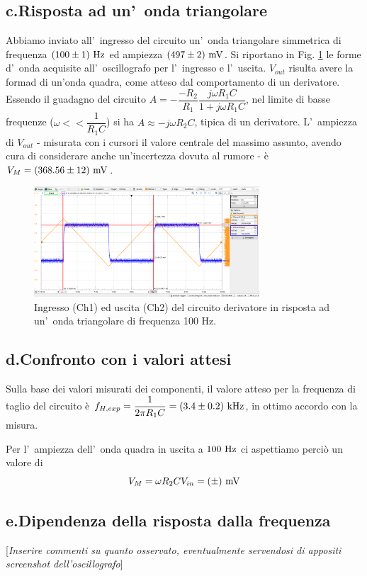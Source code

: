 \documentclass[10pt,a4paper]{article}
\newcommand{\rem}[1]{[\emph{#1}]}
\begin{document}
\subsection*{c.Risposta ad un'~onda triangolare}
Abbiamo inviato all'~ingresso del circuito un'~onda triangolare simmetrica di frequenza $(100 \pm 1) \ \rm Hz$ ed ampiezza 
$(497 \pm 2) \ \rm mV$. Si riportano in Fig. \ref{fig:oscderiv} le forme d'~onda acquisite all'~oscillografo per l'~ingresso
e l'~uscita. $V_{out}$ risulta avere la formad di un'onda quadra, come atteso dal comportamento di un derivatore. Essendo il guadagno del circuito $A=-\dfrac{-R_2}{R_1}\dfrac{j\omega R_1 C}{1+j\omega R_1 C}$, nel limite di basse frequenze ($\omega << \dfrac{1}{R_1 C}$) si ha $A\approx -j\omega R_2 C$, tipica di un derivatore. 
L'~ampiezza di $V_{out}$ - misurata con i cursori il valore centrale del massimo assunto, avendo cura di considerare anche un'incertezza dovuta al rumore - \`e $V_M =  (368.56 \pm 12) \ \rm mV$. 
%
\begin{figure}[htb]
\begin{center}
\includegraphics[width=0.75\textwidth]{derivatore.png}
\caption{\small Ingresso (Ch1) ed uscita (Ch2) del circuito derivatore in risposta ad un'~onda triangolare di frequenza 100 Hz.}
\label{fig:oscderiv}
\end{center}
\end{figure}
%
\subsection*{d.Confronto con i valori attesi}
Sulla base dei valori misurati dei componenti, il valore atteso per la frequenza di taglio del circuito \`e $f_{H,exp} = \dfrac{1}{2\pi R_1 C} = 
(3.4 \pm 0.2) \ \rm kHz$, in ottimo accordo con la misura. 

Per l'~ampiezza dell'~onda quadra in uscita a $100 \ \rm Hz$ ci aspettiamo perci\`o un valore di 
\[
V_M = \omega R_2 C V_{in}= ( \pm ) \ \rm mV
\]
\subsection*{e.Dipendenza della risposta dalla frequenza}
\rem{Inserire commenti su quanto osservato, eventualmente servendosi di appositi screenshot dell'oscillografo} 

\end{document}
